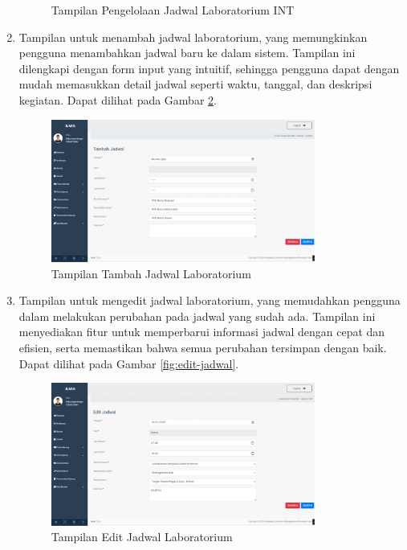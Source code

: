 \begin{enumerate}
\begin{figure}
		      \caption{Tampilan Pengelolaan Jadwal Laboratorium INT}
		      \label{fig:jadwal-int}
	      \end{figure}
	\item Tampilan untuk menambah jadwal laboratorium, yang memungkinkan pengguna menambahkan jadwal baru ke dalam sistem. Tampilan ini dilengkapi dengan form input yang intuitif, sehingga pengguna dapat dengan mudah memasukkan detail jadwal seperti waktu, tanggal, dan deskripsi kegiatan. Dapat dilihat pada Gambar \ref{fig:tambah-jadwal}.
	      \begin{figure}
		      \centering
		      \includegraphics[width=0.82\textwidth]{konten/gambar/hasil/tambah-jadwal.jpeg}
		      \caption{Tampilan Tambah Jadwal Laboratorium}
		      \label{fig:tambah-jadwal}
	      \end{figure}
	\item Tampilan untuk mengedit jadwal laboratorium, yang memudahkan pengguna dalam melakukan perubahan pada jadwal yang sudah ada. Tampilan ini menyediakan fitur untuk memperbarui informasi jadwal dengan cepat dan efisien, serta memastikan bahwa semua perubahan tersimpan dengan baik. Dapat dilihat pada Gambar \ref{fig:edit-jadwal}.
	      \begin{figure}
		      \centering
		      \includegraphics[width=0.82\textwidth]{konten/gambar/hasil/edit-jadwal.jpeg}
		      \caption{Tampilan Edit Jadwal Laboratorium}

\end{figure}
\end{enumerate}
